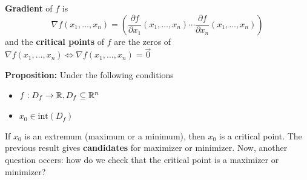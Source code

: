 \textbf{Gradient} of $f$ is 
\begin{equation*}
    \nabla f(x_1,\ldots,x_n) = \left(\frac{\partial f}{\partial x_1}(x_1,\ldots,x_n) \cdots \frac{\partial f}{\partial x_n}(x_1,\ldots,x_n)\right)
\end{equation*}
and the \textbf{critical points} of $f$ are the zeros of $\nabla f(x_1,\ldots,x_n) \Leftrightarrow \nabla f(x_1,\ldots,x_n)=\vec{0}$


\textbf{Proposition:} Under the following conditions
\begin{itemize}
    \item $f: D_f\to\mathbb{R}, D_f\subseteq\mathbb{R}^n$
    \item $x_0\in\text{int}(D_f)$
\end{itemize}
If $x_0$ is an extremum (maximum or a minimum), then $x_0$ is a critical point.
The previous result gives \textbf{candidates} for maximizer or minimizer. Now, another question occers: how do we check that the critical point is a maximizer or minimizer?

